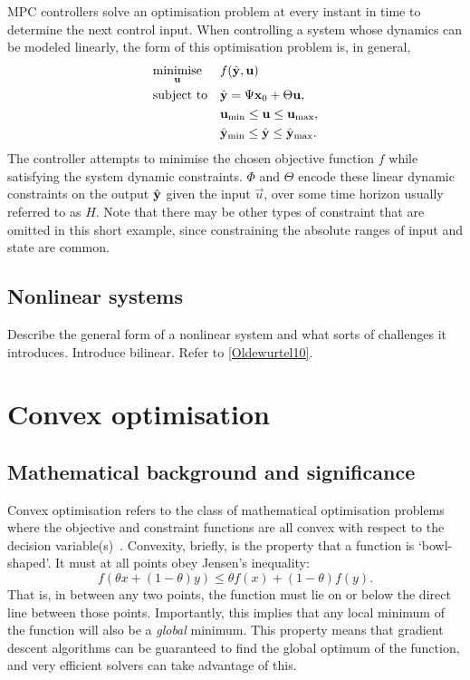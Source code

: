 MPC controllers solve an optimisation problem at every instant in time to determine the next control input.
When controlling a system whose dynamics can be modeled linearly, the form of this optimisation problem is, in general,
\begin{equation}
   \label{eq:mpc-opt}
   \begin{aligned}
      & \underset{\mathbf{u}}{\text{minimise}}
      & & f(\hat{\mathbf{y}}, \mathbf{u}) \\
      & \text{subject to}
      & & \hat{\mathbf{y}} = \Psi \mathbf{x}_0 + \Theta \mathbf{u}, \\
      &&& \mathbf{u}_{\text{min}} \le \mathbf{u} \le \mathbf{u}_{\text{max}}, \\
      &&& \hat{\mathbf{y}}_{\text{min}} \le \hat{\mathbf{y}} \le \hat{\mathbf{y}}_{\text{max}}.
   \end{aligned}
\end{equation}
The controller attempts to minimise the chosen objective function $f$ while satisfying the system dynamic constraints.
$\Phi$ and $\Theta$ encode these linear dynamic constraints on the output $\hat{\mathbf{y}}$ given the input $\vec{u}$, over some time horizon usually referred to as $H$.
Note that there may be other types of constraint that are omitted in this short example, since constraining the absolute ranges of input and state are common.

\subsection{Nonlinear systems}


Describe the general form of a nonlinear system and what sorts of challenges it introduces.
Introduce bilinear.
Refer to \ref{Oldewurtel10}.

\section{Convex optimisation}
\label{sec:background:convex}

\subsection{Mathematical background and significance}

Convex optimisation refers to the class of mathematical optimisation problems where the objective and constraint functions are all convex with respect to the decision variable(s)~\cite{Boyd04}.
Convexity, briefly, is the property that a function is `bowl-shaped'.
It must at all points obey Jensen's inequality:
\begin{equation}
   f(\theta x + (1-\theta)y) \le \theta f(x) + (1-\theta) f(y).
\end{equation}
That is, in between any two points, the function must lie on or below the direct line between those points.
Importantly, this implies that any local minimum of the function will also be a \emph{global} minimum.
This property means that gradient descent algorithms can be guaranteed to find the global optimum of the function, and very efficient solvers can take advantage of this.

